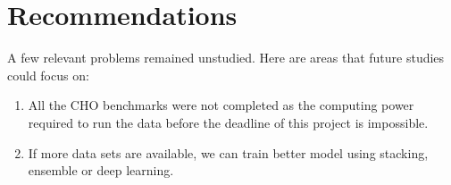 \chapter{Recommendations}

A few relevant problems remained unstudied. Here are areas that future studies could focus on:

\begin{enumerate}
    \item All the CHO benchmarks were not completed as the computing power required to run the data before the deadline of this project is impossible.
    \item If more data sets are available, we can train better model using stacking, ensemble or deep learning.
\end{enumerate}